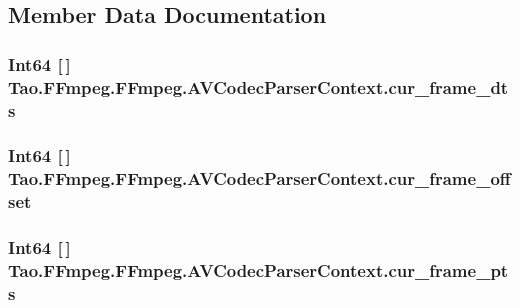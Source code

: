 \subsection{Member Data Documentation}
\hypertarget{struct_tao_1_1_f_fmpeg_1_1_f_fmpeg_1_1_a_v_codec_parser_context_a4e71814e445724f103ea128c5dd134ef}{
\subsubsection[{cur\_\-frame\_\-dts}]{\setlength{\rightskip}{0pt plus 5cm}Int64 \mbox{[}$\,$\mbox{]} {\bf Tao.FFmpeg.FFmpeg.AVCodecParserContext.cur\_\-frame\_\-dts}}}
\label{struct_tao_1_1_f_fmpeg_1_1_f_fmpeg_1_1_a_v_codec_parser_context_a4e71814e445724f103ea128c5dd134ef}
\hypertarget{struct_tao_1_1_f_fmpeg_1_1_f_fmpeg_1_1_a_v_codec_parser_context_a5a4048120f6aac43576abe973eee528f}{
\subsubsection[{cur\_\-frame\_\-offset}]{\setlength{\rightskip}{0pt plus 5cm}Int64 \mbox{[}$\,$\mbox{]} {\bf Tao.FFmpeg.FFmpeg.AVCodecParserContext.cur\_\-frame\_\-offset}}}
\label{struct_tao_1_1_f_fmpeg_1_1_f_fmpeg_1_1_a_v_codec_parser_context_a5a4048120f6aac43576abe973eee528f}
\hypertarget{struct_tao_1_1_f_fmpeg_1_1_f_fmpeg_1_1_a_v_codec_parser_context_ad29c59b23f92db28d7fc3fa243b3d7b5}{
\subsubsection[{cur\_\-frame\_\-pts}]{\setlength{\rightskip}{0pt plus 5cm}Int64 \mbox{[}$\,$\mbox{]} {\bf Tao.FFmpeg.FFmpeg.AVCodecParserContext.cur\_\-frame\_\-pts}}}
\label{struct_tao_1_1_f_fmpeg_1_1_f_fmpeg_1_1_a_v_codec_parser_context_ad29c59b23f92db28d7fc3fa243b3d7b5}
